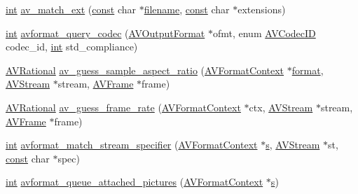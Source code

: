 \begin{DoxyCompactItemize}
\item 
\hyperlink{xmltok_8h_a5a0d4a5641ce434f1d23533f2b2e6653}{int} \hyperlink{group__lavf__misc_ga8247f49e5642dd3bd20ce6ba5a7f6466}{av\+\_\+match\+\_\+ext} (\hyperlink{getopt1_8c_a2c212835823e3c54a8ab6d95c652660e}{const} char $\ast$\hyperlink{test__portburn_8cpp_a7efa5e9c7494c7d4586359300221aa5d}{filename}, \hyperlink{getopt1_8c_a2c212835823e3c54a8ab6d95c652660e}{const} char $\ast$extensions)
\item 
\hyperlink{xmltok_8h_a5a0d4a5641ce434f1d23533f2b2e6653}{int} \hyperlink{group__lavf__misc_gada6a477d2b1d70aafea93da43a310e8a}{avformat\+\_\+query\+\_\+codec} (\hyperlink{struct_a_v_output_format}{A\+V\+Output\+Format} $\ast$ofmt, enum \hyperlink{group__lavc__core_gaadca229ad2c20e060a14fec08a5cc7ce}{A\+V\+Codec\+ID} codec\+\_\+id, \hyperlink{xmltok_8h_a5a0d4a5641ce434f1d23533f2b2e6653}{int} std\+\_\+compliance)
\item 
\hyperlink{struct_a_v_rational}{A\+V\+Rational} \hyperlink{group__lavf__misc_ga0f62da0e809045bb21166013c404ce43}{av\+\_\+guess\+\_\+sample\+\_\+aspect\+\_\+ratio} (\hyperlink{struct_a_v_format_context}{A\+V\+Format\+Context} $\ast$\hyperlink{_export_p_c_m_8cpp_a317afff57d87a89158c2b038d37b2b08}{format}, \hyperlink{struct_a_v_stream}{A\+V\+Stream} $\ast$stream, \hyperlink{struct_a_v_frame}{A\+V\+Frame} $\ast$frame)
\item 
\hyperlink{struct_a_v_rational}{A\+V\+Rational} \hyperlink{group__lavf__misc_ga12c049178414cc221dfafd4e7f836dea}{av\+\_\+guess\+\_\+frame\+\_\+rate} (\hyperlink{struct_a_v_format_context}{A\+V\+Format\+Context} $\ast$ctx, \hyperlink{struct_a_v_stream}{A\+V\+Stream} $\ast$stream, \hyperlink{struct_a_v_frame}{A\+V\+Frame} $\ast$frame)
\item 
\hyperlink{xmltok_8h_a5a0d4a5641ce434f1d23533f2b2e6653}{int} \hyperlink{group__lavf__misc_ga7e45597834e9ef3098ddb74bc5e1550c}{avformat\+\_\+match\+\_\+stream\+\_\+specifier} (\hyperlink{struct_a_v_format_context}{A\+V\+Format\+Context} $\ast$\hyperlink{lib_2expat_8h_a755339d27872b13735c2cab829e47157}{s}, \hyperlink{struct_a_v_stream}{A\+V\+Stream} $\ast$st, \hyperlink{getopt1_8c_a2c212835823e3c54a8ab6d95c652660e}{const} char $\ast$spec)
\item 
\hyperlink{xmltok_8h_a5a0d4a5641ce434f1d23533f2b2e6653}{int} \hyperlink{group__lavf__misc_ga501ff1b3aa357c09da90c0effb356e45}{avformat\+\_\+queue\+\_\+attached\+\_\+pictures} (\hyperlink{struct_a_v_format_context}{A\+V\+Format\+Context} $\ast$\hyperlink{lib_2expat_8h_a755339d27872b13735c2cab829e47157}{s})
\end{DoxyCompactItemize}


